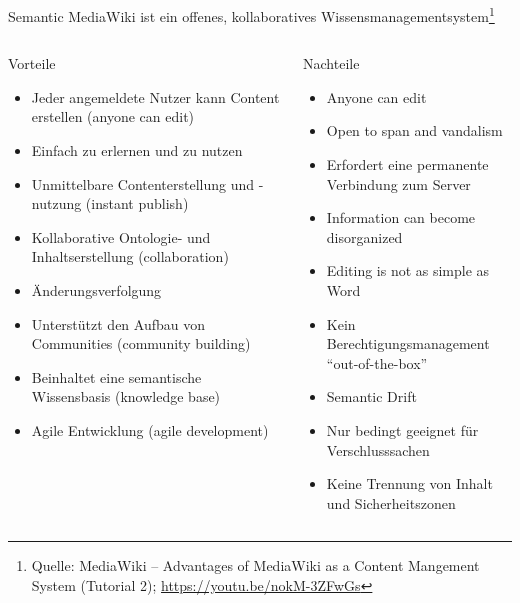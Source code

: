 \documentclass[aspectratio=1610,onlymath]{beamer}
\begin{document}
\begin{frame}{Semantic MediaWiki ist ein offenes, kollaboratives Wissensmanagementsystem\footnote{Quelle: MediaWiki – Advantages of MediaWiki as a Content Mangement System (Tutorial 2);  \url{https://youtu.be/nokM-3ZFwGs}}}

\begin{footnotesize}
\begin{columns}
\begin{column}{0.5\textwidth}

Vorteile 
\begin{itemize}
	\item Jeder angemeldete Nutzer kann Content erstellen (anyone can edit)
	\item Einfach zu erlernen und zu nutzen
	\item Unmittelbare Contenterstellung und -nutzung (instant publish)
	\item Kollaborative Ontologie- und Inhaltserstellung (collaboration)
	\item Änderungsverfolgung 
	\item Unterstützt den Aufbau von Communities (community building)
	\item Beinhaltet eine semantische Wissensbasis (knowledge base)
	\item Agile Entwicklung (agile development)
\end{itemize}
\end{column}
\begin{column}{0.5\textwidth}
Nachteile
\begin{itemize}
	\item Anyone can edit
	\item Open to span and vandalism
	\item Erfordert eine permanente Verbindung zum Server
	\item Information can become disorganized
	\item Editing is not as simple as Word
	\item Kein Berechtigungsmanagement ``out-of-the-box''
	\item Semantic Drift 
	\item Nur bedingt geeignet für Verschlusssachen
	\item Keine Trennung von Inhalt und Sicherheitszonen
\end{itemize}
\end{column}
\end{columns}
\end{footnotesize}
\end{frame}
\end{document}
